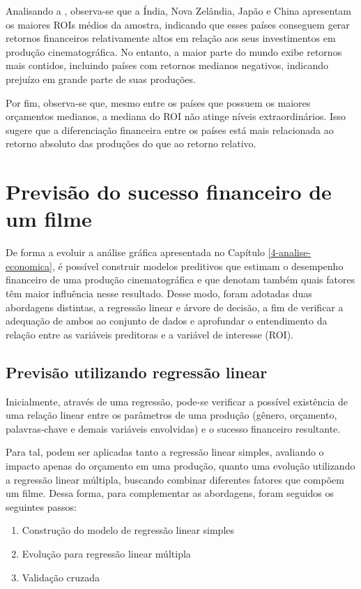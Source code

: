 Analisando a , observa-se que a Índia, Nova Zelândia, Japão e China apresentam os maiores \acrshort{ROI}s médios da amostra, indicando que esses países conseguem gerar retornos financeiros relativamente altos em relação aos seus investimentos em produção cinematográfica. No entanto, a maior parte do mundo exibe retornos mais contidos, incluindo países com retornos medianos negativos, indicando prejuízo em grande parte de suas produções.

Por fim, observa-se que, mesmo entre os países que possuem os maiores orçamentos medianos, a mediana do \acrshort{ROI} não atinge níveis extraordinários. Isso sugere que a diferenciação financeira entre os países está mais relacionada ao retorno absoluto das produções do que ao retorno relativo.

\section{Previsão do sucesso financeiro de um filme}
De forma a evoluir a análise gráfica apresentada no Capítulo \ref{4-analise-economica}, é possível construir modelos preditivos que estimam o desempenho financeiro de uma produção cinematográfica e que denotam também quais fatores têm maior influência nesse resultado. Desse modo, foram adotadas duas abordagens distintas, a regressão linear e árvore de decisão, a fim de verificar a adequação de ambos ao conjunto de dados e aprofundar o entendimento da relação entre as variáveis preditoras e a variável de interesse (\acrshort{ROI}).

\subsection{Previsão utilizando regressão linear} \label{regressao-linear}
Inicialmente, através de uma regressão, pode-se verificar a possível existência de uma relação linear entre os parâmetros de uma produção (gênero, orçamento, palavras-chave e demais variáveis envolvidas) e o sucesso financeiro resultante.

Para tal, podem ser aplicadas tanto a regressão linear simples, avaliando o impacto apenas do orçamento em uma produção, quanto uma evolução utilizando a regressão linear múltipla, buscando combinar diferentes fatores que compõem um filme. Dessa forma, para complementar as abordagens, foram seguidos os seguintes passos:

\begin{enumerate}
    \item Construção do modelo de regressão linear simples
    \item Evolução para regressão linear múltipla
    \item Validação cruzada
\end{enumerate}


